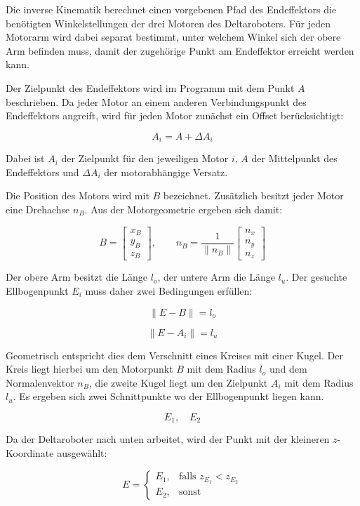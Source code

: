 
Die inverse Kinematik berechnet einen vorgebenen Pfad des Endeffektors die benötigten Winkelstellungen der drei Motoren des Deltaroboters. 
Für jeden Motorarm wird dabei separat bestimmt, unter welchem Winkel sich der obere Arm befinden muss, damit der zugehörige Punkt am Endeffektor erreicht werden kann.

Der Zielpunkt des Endeffektors wird im Programm mit dem Punkt \(A\) beschrieben. 
Da jeder Motor an einem anderen Verbindungspunkt des Endeffektors angreift, wird für jeden Motor zunächst ein Offset berücksichtigt:

\[
A_i = A + \Delta A_i
\]

Dabei ist \(A_i\) der Zielpunkt für den jeweiligen Motor \(i\), \(A\) der Mittelpunkt des Endeffektors und \(\Delta A_i\) der motorabhängige Versatz.

Die Position des Motors wird mit \(B\) bezeichnet. Zusätzlich besitzt jeder Motor eine Drehachse \(n_B\). 
Aus der Motorgeometrie ergeben sich damit:

\[
B =
\begin{bmatrix}
x_{B} \\ y_{B} \\ z_{B}
\end{bmatrix},
\qquad
n_{B} =
\frac{1}{\lVert n_{B} \rVert}
\begin{bmatrix}
n_x \\ n_y \\ n_z
\end{bmatrix}
\]

Der obere Arm besitzt die Länge \(l_o\), der untere Arm die Länge \(l_u\). 
Der gesuchte Ellbogenpunkt \(E_i\) muss daher zwei Bedingungen erfüllen:

\[
\lVert E - B \rVert = l_o
\]

\[
\lVert E - A_i \rVert = l_u
\]

Geometrisch entspricht dies dem Verschnitt eines Kreises mit einer Kugel. 
Der Kreis liegt hierbei um den Motorpunkt \(B\) mit dem Radius \(l_o\) und dem Normalenvektor \(n_{B}\), die zweite Kugel liegt um den Zielpunkt \(A_i\) mit dem Radius \(l_u\). 
Es ergeben sich zwei Schnittpunkte wo der Ellbogenpunkt liegen kann.

\[
E_1, \quad E_2
\]

Da der Deltaroboter nach unten arbeitet, wird der Punkt mit der kleineren \(z\)-Koordinate ausgewählt:

\[
E =
\begin{cases}
E_1, & \text{falls } z_{E_1} < z_{E_2} \\
E_2, & \text{sonst}
\end{cases}
\]

